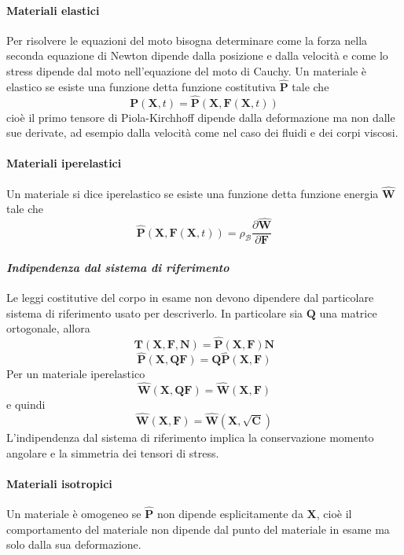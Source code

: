 \documentclass{book}
\begin{document}
\paragraph{Materiali elastici}
Per risolvere le equazioni del moto bisogna determinare come la forza nella seconda equazione di Newton dipende dalla posizione e dalla velocità e come lo stress dipende dal moto nell'equazione del moto di Cauchy. 
Un materiale è elastico se esiste una funzione detta funzione costitutiva $\hat{\mathbf{P}}$ tale che
$$\mathbf{P}(\mathbf{X},t)=\hat{\mathbf{P}}(\mathbf{X},\mathbf{F}(\mathbf{X},t)) $$
cioè il primo tensore di Piola-Kirchhoff dipende dalla deformazione ma non dalle sue derivate, ad esempio dalla velocità come nel caso dei fluidi e dei corpi viscosi.
\paragraph{Materiali iperelastici}
Un materiale si dice iperelastico se esiste una funzione detta funzione energia  $\widehat{\mathbf{W}}$ tale che 
$$\widehat{\mathbf{P}}(\mathbf{X},\mathbf{F}(\mathbf{X},t))=\rho_{\mathcal{B}}\frac{\partial \widehat{\mathbf{W}}}{\partial \mathbf{F}} $$
\paragraph{\emph{Indipendenza dal sistema di riferimento}}
Le leggi costitutive del corpo in esame non devono dipendere dal particolare sistema di riferimento usato per descriverlo.
In particolare sia $\mathbf{Q}$ una matrice ortogonale, allora 
$$\mathbf{T}(\mathbf{X},\mathbf{F},\mathbf{N}) = \widehat{\mathbf{P}}(\mathbf{X},\mathbf{F})\mathbf{N} $$
$$\widehat{\mathbf{P}}(\mathbf{X},\mathbf{Q}\mathbf{F}) = \mathbf{Q}\widehat{\mathbf{P}}(\mathbf{X},\mathbf{F}) $$
Per un materiale iperelastico 
$$\widehat{\mathbf{W}}(\mathbf{X},\mathbf{Q}\mathbf{F}) = \widehat{\mathbf{W}}(\mathbf{X},\mathbf{F}) $$
e quindi
$$\widehat{\mathbf{W}}(\mathbf{X},\mathbf{F}) = \widehat{\mathbf{W}}(\mathbf{X},\sqrt{\mathbf{C}}) $$
L'indipendenza dal sistema di riferimento implica la conservazione momento angolare e la simmetria dei tensori di stress.
\paragraph{Materiali isotropici}
Un materiale è omogeneo se $\widehat{\mathbf{P}}$ non dipende esplicitamente da $\mathbf{X}$, cioè il comportamento del materiale non dipende dal punto del materiale in esame ma solo dalla sua deformazione.
\end{document}
